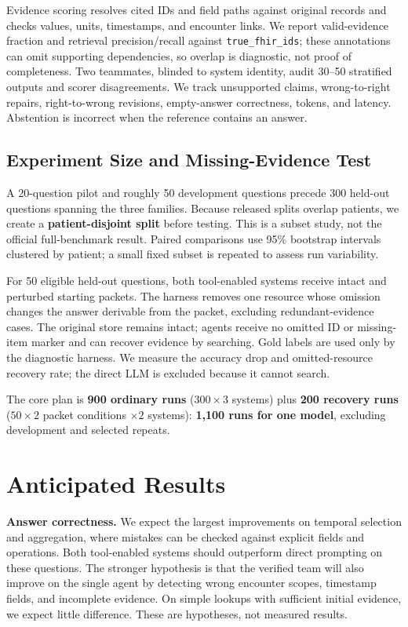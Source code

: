 \documentclass[sigconf,nonacm]{acmart}
\begin{document}
Evidence scoring resolves cited IDs and field paths against original records and checks values, units, timestamps, and encounter links. We report valid-evidence fraction and retrieval precision/recall against \texttt{true\_fhir\_ids}; these annotations can omit supporting dependencies, so overlap is diagnostic, not proof of completeness. Two teammates, blinded to system identity, audit 30--50 stratified outputs and scorer disagreements. We track unsupported claims, wrong-to-right repairs, right-to-wrong revisions, empty-answer correctness, tokens, and latency. Abstention is incorrect when the reference contains an answer.

\subsection{Experiment Size and Missing-Evidence Test}
A 20-question pilot and roughly 50 development questions precede 300 held-out questions spanning the three families. Because released splits overlap patients, we create a \textbf{patient-disjoint split} before testing. This is a subset study, not the official full-benchmark result. Paired comparisons use 95\% bootstrap intervals clustered by patient; a small fixed subset is repeated to assess run variability.

For 50 eligible held-out questions, both tool-enabled systems receive intact and perturbed starting packets. The harness removes one resource whose omission changes the answer derivable from the packet, excluding redundant-evidence cases. The original store remains intact; agents receive no omitted ID or missing-item marker and can recover evidence by searching. Gold labels are used only by the diagnostic harness. We measure the accuracy drop and omitted-resource recovery rate; the direct LLM is excluded because it cannot search.

The core plan is \textbf{900 ordinary runs} ($300\times3$ systems) plus \textbf{200 recovery runs} ($50\times2$ packet conditions $\times2$ systems): \textbf{1,100 runs for one model}, excluding development and selected repeats.

\section{Anticipated Results}
\textbf{Answer correctness.} We expect the largest improvements on temporal selection and aggregation, where mistakes can be checked against explicit fields and operations. Both tool-enabled systems should outperform direct prompting on these questions. The stronger hypothesis is that the verified team will also improve on the single agent by detecting wrong encounter scopes, timestamp fields, and incomplete evidence. On simple lookups with sufficient initial evidence, we expect little difference. These are hypotheses, not measured results.
\end{document}
